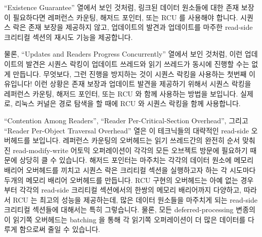``Existence Guarantee'' 열에서 보인 것처럼, 링크된 데이터 원소들에 대한 존재
보장이 필요하다면 레퍼런스 카운팅, 해저드 포인터, 또는 RCU 를 사용해야 합니다.
시퀀스 락은 존재 보장을 제공하지 않고, 업데이트의 발견과 업데이트를 마주한
read-side 크리티컬 섹션의 재시도 기능을 제공합니다.
\iffalse

Table~\ref{tab:defer:Which Deferred Technique to Choose? (Details)}
provides more-detailed rules of thumb that can help you choose among the
four deferred-processing techniques presented in this chapter.

As shown in the ``Existence Guarantee'' row,
if you need existence guarantees for linked
data elements, you must use reference counting, hazard pointers, or RCU.
Sequence locks do not provide existence guarantees, instead providing
detection of updates, retrying any read-side critical sections
that do encounter an update.
\fi

물론, ``Updates and Readers Progress Concurrently'' 열에서 보인 것처럼, 이런
업데이트의 발견은 시퀀스 락킹이 업데이트 쓰레드와 읽기 쓰레드가 동시에 진행할
수는 없게 만듭니다.
무엇보다, 그런 진행을 방지하는 것이 시퀀스 락킹을 사용하는 첫번째 이유입니다!
이런 상황은 존재 보장과 업데이트 발견을 제공하기 위해서 시퀀스 락킹을 레퍼런스
카운팅, 해저드 포인터, 또는 RCU 와 함께 사용하는 방법을 보입니다.
실제로, 리눅스 커널은 경로 탐색을 할 때에 RCU 와 시퀀스 락킹을 함께 사용합니다.
\iffalse

Of course, as shown in the ``Updates and Readers Progress Concurrently''
row, this detection of updates implies
that sequence locking does not permit updaters and readers to make forward
progress concurrently.
After all, preventing such forward progress is the whole point of using
sequence locking in the first place!
This situation points the way to using sequence locking in conjunction
with reference counting, hazard pointers, or RCU in order to provide
both existence guarantees and update detection.
In fact, the Linux kernel combines RCU and sequence locking in
this manner during pathname lookup.
\fi

``Contention Among Readers'', ``Reader Per-Critical-Section Overhead'',
그리고 ``Reader Per-Object Traversal Overhead'' 열은 이 테크닉들의 대략적인
read-side 오버헤드를 보입니다.
레퍼런스 카운팅의 오버헤드는 읽기 쓰레드간의 완전히 순서 맞춰진
read-modify-write 어토믹 오퍼레이션이 각각의 모든 오브젝트 방문에 필요하기
때문에 상당히 클 수 있습니다.
해저드 포인터는 마주치는 각각의 데이터 원소에 메모리 배리어 오버헤드를 끼치고
시퀀스 락은 크리티컬 섹션을 실행하고자 하는 각 시도마다 두개의 메모리 배리어
오버헤드를 만듭니다.
RCU 구현의 오버헤드는 아예 없는 경우부터 각각의 read-side 크리티컬 섹션에서의
한쌍의 메모리 배리어까지 다양하고, 따라서 RCU 는 최고의 성능을 제공하는데, 많은
데이터 원소들을 마주치게 되는 read-side 크리티컬 섹션들에 대해서는 특히
그렇습니다.
물론, 모든 deferred-processing 변종의 이 읽기쪽 오버헤드는 batching 을 통해 각
읽기쪽 오퍼레이션이 더 많은 데이터를 다루게 함으로써 줄일 수 있습니다.
\iffalse

